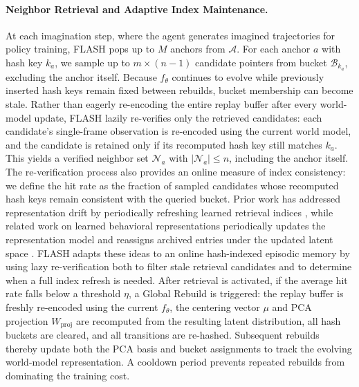 \documentclass{article} %
\begin{document}
\paragraph{Neighbor Retrieval and Adaptive Index Maintenance.} At each imagination step, where the agent generates imagined trajectories for policy training, FLASH pops up to $M$ anchors from $\mathcal{A}$. For each anchor $a$ with hash key $k_a$, we sample up to $m \times (n{-}1)$ candidate pointers from bucket $\mathcal{B}_{k_a}$, excluding the anchor itself. Because $f_\theta$ continues to evolve while previously inserted hash keys remain fixed between rebuilds, bucket membership can become stale. Rather than eagerly re-encoding the entire replay buffer after every world-model update, FLASH lazily re-verifies only the retrieved candidates: each candidate's single-frame observation is re-encoded using the current world model, and the candidate is retained only if its recomputed hash key still matches $k_a$. This yields a verified neighbor set $\mathcal{N}_a$ with $|\mathcal{N}_a| \leq n$, including the anchor itself. The re-verification process also provides an online measure of index consistency: we define the hit rate as the fraction of sampled candidates whose recomputed hash keys remain consistent with the queried bucket. Prior work has addressed representation drift by periodically refreshing learned retrieval indices \citep{guu2020realm,izacard2023atlas}, while related work on learned behavioral representations periodically updates the representation model and reassigns archived entries under the updated latent space \citep{cully2019autonomous}. FLASH adapts these ideas to an online hash-indexed episodic memory by using lazy re-verification both to filter stale retrieval candidates and to determine when a full index refresh is needed. After retrieval is activated, if the average hit rate falls below a threshold $\eta$, a Global Rebuild is triggered: the replay buffer is freshly re-encoded using the current $f_\theta$, the centering vector $\mu$ and PCA projection $W_{\mathrm{proj}}$ are recomputed from the resulting latent distribution, all hash buckets are cleared, and all transitions are re-hashed. Subsequent rebuilds thereby update both the PCA basis and bucket assignments to track the evolving world-model representation. A cooldown period prevents repeated rebuilds from dominating the training cost.
\end{document}

